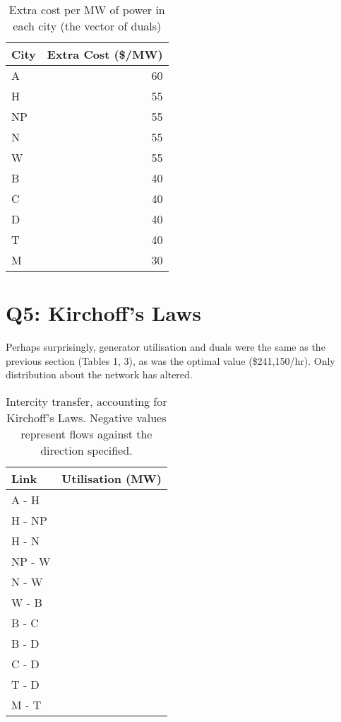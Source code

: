 \documentclass[11pt]{article}
\begin{document}
\begin{table}[h]
	\centering
	\begin{tabular}{@{}lr@{}}
	\toprule
	City & Extra Cost (\$/MW) \\ \midrule
	A       & 60             \\
	H       & 55               \\
	NP      & 55              \\
	N       & 55             \\
	W       & 55              \\
	B       & 40                \\
	C       & 40             \\
	D       & 40              \\
	T       & 40              \\
	M       & 30              \\ \bottomrule
	\end{tabular}
	\caption{Extra cost per MW of power in each city (the vector of duals)}
\end{table}

\section*{Q5: Kirchoff's Laws}
Perhaps surprisingly, generator utilisation and duals were the same as the previous section (Tables 1, 3), as was the optimal value (\$241,150/hr). Only distribution about the network has altered.

\begin{table}[h]
	\centering
	\begin{tabular}{@{}lr@{}}
	\toprule
	Link & Utilisation (MW) \\ \midrule
	A - H       & \color{red}{$-500$}        \\
	H - NP      & \color{red}{$-280$}        \\
	H - N       & \color{ForestGreen}{$143$} \\
	NP - W      & \color{red}{$-4$}          \\
	N - W       & \color{red}{$-141$}        \\
	W - B       & \color{red}{$-1000$}       \\
	B - C       & \color{ForestGreen}{$292.17$}   \\
	B - D       & \color{red}{$-22.2$}              \\
	C - D       & \color{red}{$-785.8$}              \\
	T - D       & \color{ForestGreen}{$233$}              \\
	M - T       & \color{ForestGreen}{$850$}              \\ \bottomrule
	\end{tabular}
	\caption{Intercity transfer, accounting for Kirchoff's Laws. Negative values represent flows against the direction specified.}
\end{table}
\end{document}
